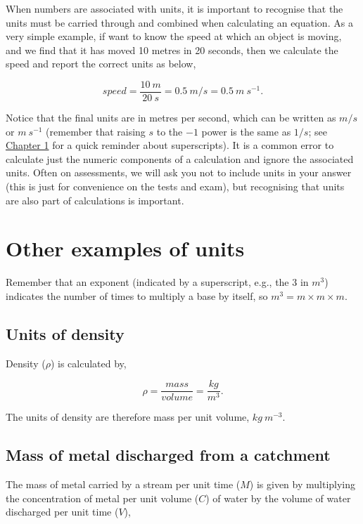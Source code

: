 \documentclass[
]{scrbook}
\begin{document}
When numbers are associated with units, it is important to recognise that the units must be carried through and combined when calculating an equation.
As a very simple example, if want to know the speed at which an object is moving, and we find that it has moved 10 metres in 20 seconds, then we calculate the speed and report the correct units as below,

\[speed = \frac{10\:m}{20\:s} = 0.5\:m/s = 0.5\:m\:s^{-1}.\]

Notice that the final units are in metres per second, which can be written as \(m/s\) or \(m\:s^{-1}\) (remember that raising \(s\) to the \(-1\) power is the same as \(1/s\); see \protect\hyperlink{Chapter_1}{Chapter 1} for a quick reminder about superscripts).
It is a common error to calculate just the numeric components of a calculation and ignore the associated units.
Often on assessments, we will ask you not to include units in your answer (this is just for convenience on the tests and exam), but recognising that units are also part of calculations is important.

\hypertarget{other-examples-of-units}{%
\section{Other examples of units}\label{other-examples-of-units}}

Remember that an exponent (indicated by a superscript, e.g., the 3 in \(m^{3}\)) indicates the number of times to multiply a base by itself, so \(m^{3} = m \times m \times m\).

\hypertarget{units-of-density}{%
\subsection{Units of density}\label{units-of-density}}

Density (\(\rho\)) is calculated by,

\[\rho = \frac{mass}{volume} = \frac{kg}{m^{3}}.\]

The units of density are therefore mass per unit volume, \(kg\:m^{-3}\).

\hypertarget{mass-of-metal-discharged-from-a-catchment}{%
\subsection{Mass of metal discharged from a catchment}\label{mass-of-metal-discharged-from-a-catchment}}

The mass of metal carried by a stream per unit time (\(M\)) is given by multiplying the concentration of metal per unit volume (\(C\)) of water by the volume of water discharged per unit time (\(V\)),
\end{document}
